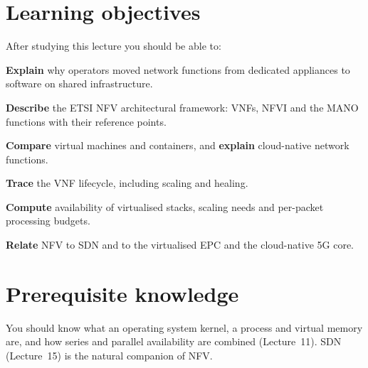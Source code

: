 \documentclass[11pt,a4paper]{article}
\begin{document}
\ACNcover

\section{Learning objectives}
After studying this lecture you should be able to:
\begin{objectives}
  \item \textbf{Explain} why operators moved network functions from dedicated appliances to software on
        shared infrastructure.
  \item \textbf{Describe} the ETSI NFV architectural framework: VNFs, NFVI and the MANO functions with their
        reference points.
  \item \textbf{Compare} virtual machines and containers, and \textbf{explain} cloud-native network functions.
  \item \textbf{Trace} the VNF lifecycle, including scaling and healing.
  \item \textbf{Compute} availability of virtualised stacks, scaling needs and per-packet processing budgets.
  \item \textbf{Relate} NFV to SDN and to the virtualised EPC and the cloud-native 5G core.
\end{objectives}

\section{Prerequisite knowledge}
You should know what an operating system kernel, a process and virtual memory are, and how series and
parallel availability are combined (Lecture~11). SDN (Lecture~15) is the natural companion of NFV.
\end{document}
